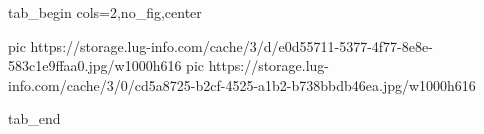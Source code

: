  
 
 
 
 

\ifcmt
  tab_begin cols=2,no_fig,center

     pic https://storage.lug-info.com/cache/3/d/e0d55711-5377-4f77-8e8e-583c1e9ffaa0.jpg/w1000h616%
		 pic https://storage.lug-info.com/cache/3/0/cd5a8725-b2cf-4525-a1b2-b738bbdb46ea.jpg/w1000h616%

  tab_end
\fi
